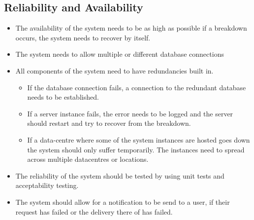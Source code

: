 \documentclass[a4paper,12pt,titlepage]{article}
\begin{document}
\subsection{Reliability and Availability}
\begin{itemize}
	\item The availability of the system needs to be as high as possible if a breakdown occurs, the system needs to recover by itself. 
	\item The system needs to allow multiple or different database connections
	\item All components of the system need to have redundancies built in.
	\begin{itemize}
		\item If the database connection fails, a connection to the redundant database needs to be established. 
		\item If a server instance fails, the error needs to be logged and the server should restart and try to recover from the breakdown. 
		\item If a data-centre where some of the system instances are hosted goes down the system should only suffer temporarily. The instances need to spread across multiple datacentres or locations. 
	\end{itemize}
	\item The reliability of the system should be tested by using unit tests and acceptability testing.
	\item The system should allow for a notification to be send to a user, if their request has failed or the delivery there of has failed. 
\end{itemize}
\end{document}
